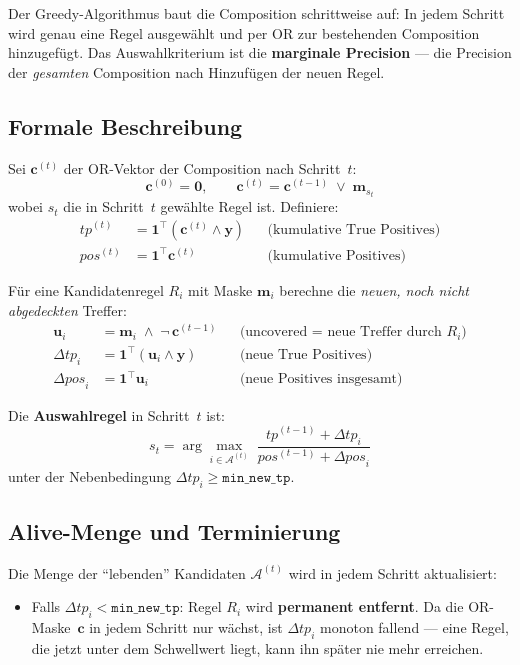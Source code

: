 \documentclass[11pt,a4paper]{article}
\begin{document}
Der Greedy-Algorithmus baut die Composition schrittweise auf: In jedem Schritt wird genau eine Regel ausgew\"ahlt und per OR zur bestehenden Composition hinzugef\"ugt. Das Auswahlkriterium ist die \textbf{marginale Precision} --- die Precision der \emph{gesamten} Composition nach Hinzuf\"ugen der neuen Regel.

\subsection{Formale Beschreibung}

Sei $\mathbf{c}^{(t)}$ der OR-Vektor der Composition nach Schritt~$t$:
\[
  \mathbf{c}^{(0)} = \mathbf{0}, \qquad \mathbf{c}^{(t)} = \mathbf{c}^{(t-1)} \;\vee\; \mathbf{m}_{s_t}
\]
wobei $s_t$ die in Schritt~$t$ gew\"ahlte Regel ist. Definiere:
\begin{align*}
  \mathit{tp}^{(t)} &= \mathbf{1}^\top(\mathbf{c}^{(t)} \wedge \mathbf{y}) &&\text{(kumulative True Positives)}\\
  \mathit{pos}^{(t)} &= \mathbf{1}^\top \mathbf{c}^{(t)} &&\text{(kumulative Positives)}
\end{align*}

\noindent F\"ur eine Kandidatenregel $R_i$ mit Maske $\mathbf{m}_i$ berechne die \emph{neuen, noch nicht abgedeckten} Treffer:
\begin{align*}
  \mathbf{u}_i &= \mathbf{m}_i \;\wedge\; \neg\,\mathbf{c}^{(t-1)} &&\text{(uncovered = neue Treffer durch $R_i$)}\\
  \Delta\mathit{tp}_i &= \mathbf{1}^\top(\mathbf{u}_i \wedge \mathbf{y}) &&\text{(neue True Positives)}\\
  \Delta\mathit{pos}_i &= \mathbf{1}^\top \mathbf{u}_i &&\text{(neue Positives insgesamt)}
\end{align*}

\noindent Die \textbf{Auswahlregel} in Schritt~$t$ ist:
\[
  s_t = \arg\max_{i \in \mathcal{A}^{(t)}} \;\frac{\mathit{tp}^{(t-1)} + \Delta\mathit{tp}_i}{\mathit{pos}^{(t-1)} + \Delta\mathit{pos}_i}
\]
unter der Nebenbedingung $\Delta\mathit{tp}_i \geq \texttt{min\_new\_tp}$.

\subsection{Alive-Menge und Terminierung}

Die Menge der ``lebenden'' Kandidaten $\mathcal{A}^{(t)}$ wird in jedem Schritt aktualisiert:
\begin{itemize}[nosep]
  \item Falls $\Delta\mathit{tp}_i < \texttt{min\_new\_tp}$: Regel $R_i$ wird \textbf{permanent entfernt}. Da die OR-Maske~$\mathbf{c}$ in jedem Schritt nur w\"achst, ist $\Delta\mathit{tp}_i$ monoton fallend --- eine Regel, die jetzt unter dem Schwellwert liegt, kann ihn sp\"ater nie mehr erreichen.
\end{itemize}
\end{document}
